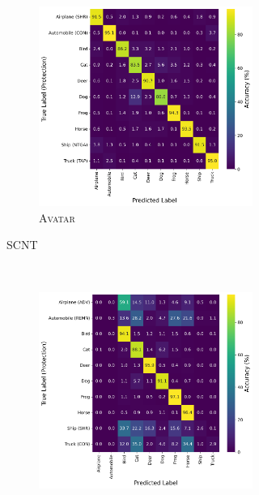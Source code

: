 \documentclass[conference]{IEEEtran}
\theoremstyle{definition}
\theoremstyle{remark}
\theoremstyle{proposition}
\begin{document}
\begin{figure}[p!]
\begin{subfigure}{1.0\textwidth}
\begin{subfigure}{.40\textwidth}
    		\includegraphics[width=1.0\textwidth]{combination_attacks/ResNet18_SCNT_t_200_confusion_matrix.png}
            \caption*{\textsc{Avatar}}
    	\end{subfigure}
	\caption{SCNT}
    \vspace*{2em}
    \end{subfigure}
        \\
    \begin{subfigure}{1.0\textwidth}
    \centering
        \begin{subfigure}{.40\textwidth}
    		\centering
    		\includegraphics[width=1.0\textwidth]{combination_attacks/ResNet18_TRSC_t_0_confusion_matrix.png}

\end{subfigure}
\end{subfigure}
\end{figure}
\end{document}

